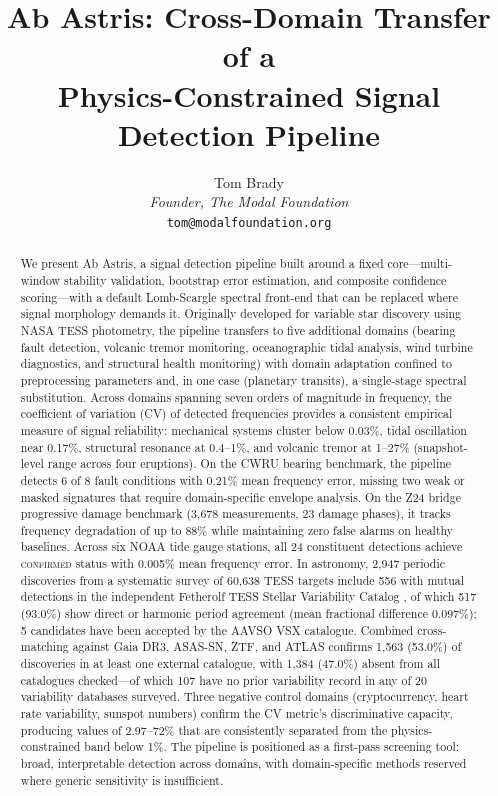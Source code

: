 \documentclass[11pt,a4paper]{article}
\title{\textbf{Ab Astris: Cross-Domain Transfer of a\\
Physics-Constrained Signal Detection Pipeline}}
\author{Tom Brady\\
\textit{Founder, The Modal Foundation}\\
\texttt{tom@modalfoundation.org}}
\date{}
\begin{document}
\maketitle

\begin{abstract}
We present Ab Astris, a signal detection pipeline built around a fixed core---multi-window stability validation, bootstrap error estimation, and composite confidence scoring---with a default Lomb-Scargle spectral front-end that can be replaced where signal morphology demands it. Originally developed for variable star discovery using NASA TESS photometry, the pipeline transfers to five additional domains (bearing fault detection, volcanic tremor monitoring, oceanographic tidal analysis, wind turbine diagnostics, and structural health monitoring) with domain adaptation confined to preprocessing parameters and, in one case (planetary transits), a single-stage spectral substitution. Across domains spanning seven orders of magnitude in frequency, the coefficient of variation (CV) of detected frequencies provides a consistent empirical measure of signal reliability: mechanical systems cluster below 0.03\%, tidal oscillation near 0.17\%, structural resonance at 0.4--1\%, and volcanic tremor at 1--27\% (snapshot-level range across four eruptions). On the CWRU bearing benchmark, the pipeline detects 6 of 8 fault conditions with 0.21\% mean frequency error, missing two weak or masked signatures that require domain-specific envelope analysis. On the Z24 bridge progressive damage benchmark (3{,}678 measurements, 23 damage phases), it tracks frequency degradation of up to 88\% while maintaining zero false alarms on healthy baselines. Across six NOAA tide gauge stations, all 24 constituent detections achieve \textsc{confirmed} status with 0.005\% mean frequency error. In astronomy, 2{,}947 periodic discoveries from a systematic survey of 60{,}638 TESS targets include 556 with mutual detections in the independent Fetherolf TESS Stellar Variability Catalog \citep{Fetherolf2023}, of which 517 (93.0\%) show direct or harmonic period agreement (mean fractional difference 0.097\%); 5 candidates have been accepted by the AAVSO VSX catalogue. Combined cross-matching against Gaia DR3, ASAS-SN, ZTF, and ATLAS confirms 1{,}563 (53.0\%) of discoveries in at least one external catalogue, with 1{,}384 (47.0\%) absent from all catalogues checked---of which 107 have no prior variability record in any of 20 variability databases surveyed. Three negative control domains (cryptocurrency, heart rate variability, sunspot numbers) confirm the CV metric's discriminative capacity, producing values of 2.97--72\% that are consistently separated from the physics-constrained band below 1\%. The pipeline is positioned as a first-pass screening tool: broad, interpretable detection across domains, with domain-specific methods reserved where generic sensitivity is insufficient.
\end{abstract}
\end{document}
